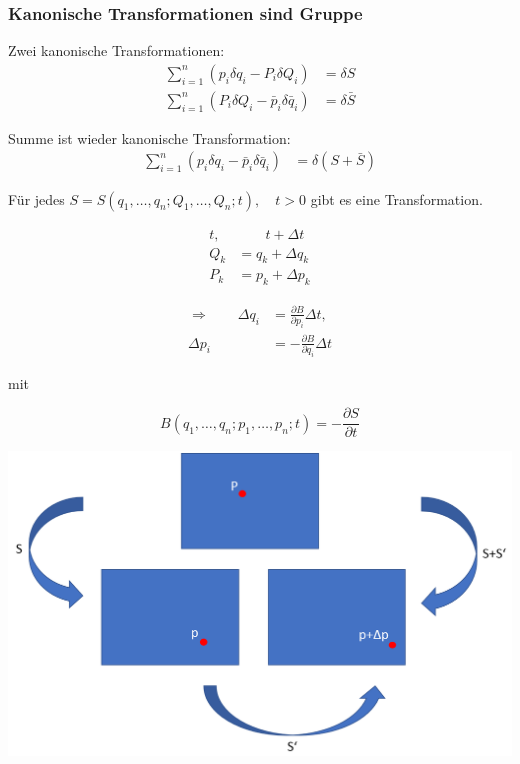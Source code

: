 \begin{frame}
    \frametitle{Kanonische Transformationen sind Gruppe}
    
    Zwei kanonische Transformationen:
    \begin{align*}
        \sum_{i=1}^{n} (p_i \delta q_i - P_i \delta Q_i) &= \delta S \\
        \sum_{i=1}^{n} (P_i \delta Q_i - \bar{p}_i \delta \bar{q}_i) &= \delta \bar{S}
    \end{align*}
    
    Summe ist wieder kanonische Transformation:
        \begin{align*}
        \sum_{i=1}^{n} (p_i \delta q_i - \bar{p}_i \delta \bar{q}_i) &= \delta (S + \bar{S}) 
        \end{align*}
        
    Für jedes $S=S(q_1,\ldots,q_n; Q_1,\ldots,Q_n;t),\quad t>0$ gibt es eine Transformation.
    
\end{frame}


\begin{frame}
    \begin{align*}
        t,&\qquad t+\Delta t \\
        Q_k &= q_k + \Delta q_k \\
        P_k &= p_k + \Delta p_k
    \end{align*}
    
    \begin{align*}
        \Longrightarrow \qquad \Delta q_i &= \frac{\partial B}{\partial p_i} \Delta t,\\
                         \Delta p_i &= -\frac{\partial B}{\partial q_i} \Delta t
    \end{align*}
    
    mit
    
    \begin{displaymath}
        B(q_1,\ldots,q_n; p_1,\ldots,p_n;t) = -\frac{\partial S}{\partial t}
    \end{displaymath}
\end{frame}

\begin{frame}
\hspace*{-2.2cm}\includegraphics[scale=0.375]{images/ImagTrans}
\end{frame}

